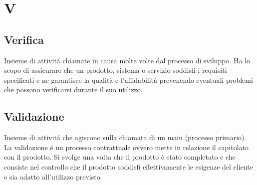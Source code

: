 \section{V}
\subsection{Verifica}%
Insieme di attivitá chiamate in causa molte volte dal processo di sviluppo.
Ha lo scopo di assicurare che un prodotto, sistema o servizio soddisfi i requisiti specificati e ne 
garantisce la qualità e l'affidabilità prevenendo eventuali problemi che possono verificarsi durante il suo utilizzo.
\subsection{Validazione}%
Insieme di attivitá che agiscono sulla chiamata di un main (processo primario).
La validazione é un processo contrattuale ovvero mette in relazione il capitolato con il prodotto.
Si svolge una volta che il prodotto è stato completato e che consiste nel
controllo che il prodotto soddisfi effettivamente le esigenze del cliente e sia adatto all'utilizzo previsto.
\clearpage